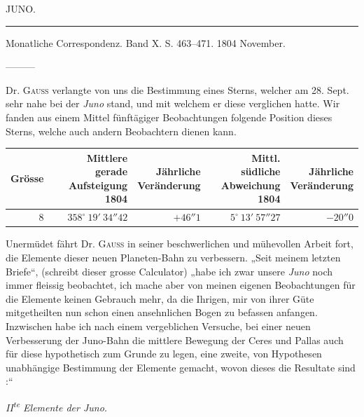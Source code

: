 \clearpage
{}
\hypertarget{native-261-lower}{}
\begin{center}
JUNO.

\rule{0.75\linewidth}{0.4pt}

Monatliche Correspondenz. Band X. S. 463–471. 1804 November.
\end{center}

\noindent—\quad—\quad—\par
Dr. \textsc{Gauss} verlangte von uns die Bestimmung eines Sterns, welcher am 28. Sept. sehr nahe bei der \emph{Juno} stand, und mit welchem er diese verglichen hatte. Wir fanden aus einem Mittel fünftägiger Beobachtungen folgende Position dieses Sterns, welche auch andern Beobachtern dienen kann.

\begin{center}
\begingroup\fontsize{9}{11}\selectfont\setlength{\tabcolsep}{3pt}\renewcommand{\arraystretch}{1.1}
\begin{tabular}{r|r|r|r|r}
Grösse & \shortstack{Mittlere gerade\\Aufsteigung\\1804} & \shortstack{Jährliche\\Veränderung} & \shortstack{Mittl. südliche\\Abweichung\\1804} & \shortstack{Jährliche\\Veränderung}\\ \hline
8 & $358^\circ\ 19'\ 34''42$ & $+46''1$ & $5^\circ\ 13'\ 57''27$ & $-20''0$ \\
\end{tabular}\endgroup
\end{center}


Unermüdet fährt Dr. \textsc{Gauss} in seiner beschwerlichen und mühevollen Arbeit fort, die Elemente dieser neuen Planeten-Bahn zu verbessern. „Seit meinem letzten Briefe“, (schreibt dieser grosse Calculator) „habe ich zwar unsere \emph{Juno} noch immer fleissig beobachtet, ich mache aber von meinen eigenen Beobachtungen für die Elemente keinen Gebrauch mehr, da die Ihrigen, mir von ihrer Güte mitgetheilten nun schon einen ansehnlichen Bogen zu befassen anfangen. Inzwischen habe ich nach einem vergeblichen Versuche, bei einer neuen Verbesserung der Juno-Bahn die mittlere Bewegung der Ceres und Pallas auch für diese hypothetisch zum Grunde zu legen, eine zweite, von Hypothesen unabhängige Bestimmung der Elemente gemacht, wovon dieses die Resultate sind :“

\begin{center}
\emph{II\textsuperscript{te} Elemente der Juno.}
\end{center}

